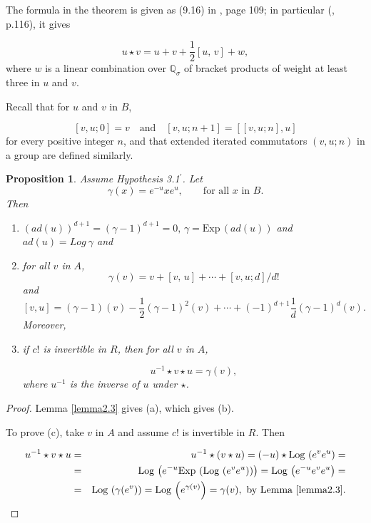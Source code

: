 \documentclass[mathscr]{amsart}
\theoremstyle{theorem}
\newtheorem{prop}[theorem]{Proposition}
\theoremstyle{definition}
\numberwithin{equation}{section}
\def \({\left(}
\def \){\right)}
\def \Exp{\text{Exp}\,}
\def \Log{\text{Log}\,}
\begin{document}
 The formula in the theorem is given as (9.16) %
 in \cite{Kh}, page 109; in particular (\cite{Ddms}, p.116),
 it gives

 \begin{equation}
u\star v=u+v+\frac 12 [u,\,v]+w,\label{eq2.2}
 \end{equation}
where $w$ is a linear combination over $\mathbb{Q}_\sigma$ of
bracket products of weight at least three in $u$ and $v$.

Recall that for $u$ and $v$ in $B$,

$$[v,u;0]=v\quad\text{and}\quad[v,u;n+1]=\left[[v,u;n],u\right]$$
for every positive integer $n$, and that extended iterated
commutators $(v,u;n)$ in a group are defined similarly.

\begin{prop}\label{prop2.5} Assume Hypothesis 3.1$^\prime$. %
Let
$$\gamma(x)=e^{-u}x e^u,\qquad\text{for all }x\text{ in }B.$$
Then

\begin{enumerate}
\item[(a)] $\(ad(u)\)^{d+1}=(\gamma-1)^{d+1}=0,\,\gamma=\Exp\(ad(u)\)$ and
$ad(u)=Log\ \gamma$ and

\item[(b)] for all $v$ in $A$,
$$\gamma(v) = v + [v,\,u]+\cdots + [v,u;d]/d!$$
and
$$
[v,u]=\(\gamma-1\)(v)-\frac 12
\(\gamma-1\)^2(v)+\cdots+(-1)^{d+1}\frac1d\(\gamma-1\)^d(v).
$$
Moreover,

\item[(c)] if $c!$ is invertible in $R$, then for all $v$ in $A$,

$$u^{-1}\star v\star u=\gamma(v),$$
where $u^{-1}$ is the inverse of $u$ under $\star$.
\end{enumerate}
\end{prop}

\begin{proof}
Lemma \ref{lemma2.3} gives (a), which gives (b).

To prove (c), take $v$ in $A$ and assume $c!$ is invertible in $R$.
Then

\begin{eqnarray*}
u^{-1}\star v\star u&=&u^{-1}\star (v\star u)=(-u)\star \Log\(e^v
e^u\) =\\
&=&\Log\(e^{-u}\Exp\(\Log\(e^v e^u\)\)\)=\Log\(e^{-u}e^ve^u\)=\\
&=&\Log\(\gamma(e^v)\)=\Log\(e^{\gamma(v)}\)=\gamma(v),\text{ by
Lemma \ref{lemma2.3}}.
\end{eqnarray*}

\end{proof}
\end{document}
